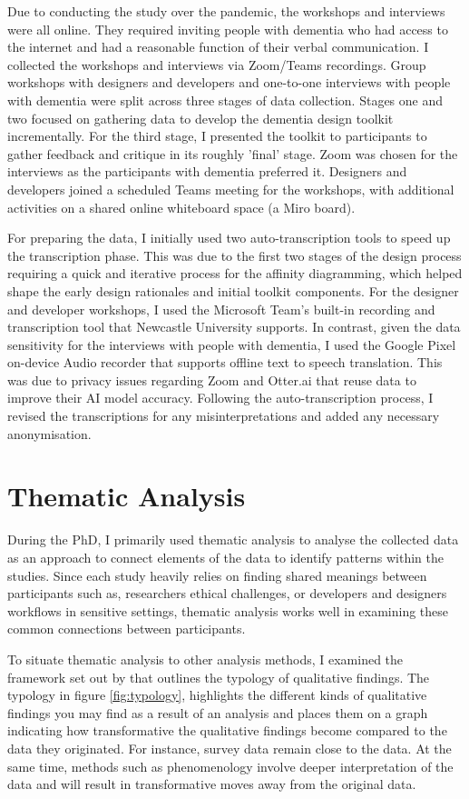 Due to conducting the study over the pandemic, the workshops and interviews were all online. They required inviting people with dementia who had access to the internet and had a reasonable function of their verbal communication. I collected the workshops and interviews via Zoom/Teams recordings. Group workshops with designers and developers and one-to-one interviews with people with dementia were split across three stages of data collection. Stages one and two focused on gathering data to develop the dementia design toolkit incrementally. For the third stage, I presented the toolkit to participants to gather feedback and critique in its roughly 'final' stage. Zoom was chosen for the interviews as the participants with dementia preferred it. Designers and developers joined a scheduled Teams meeting for the workshops, with additional activities on a shared online whiteboard space (a Miro board).

For preparing the data, I initially used two auto-transcription tools to speed up the transcription phase. This was due to the first two stages of the design process requiring a quick and iterative process for the affinity diagramming, which helped shape the early design rationales and initial toolkit components. For the designer and developer workshops, I used the Microsoft Team's built-in recording and transcription tool that Newcastle University supports. In contrast, given the data sensitivity for the interviews with people with dementia, I used the Google Pixel on-device Audio recorder that supports offline text to speech translation. This was due to privacy issues regarding Zoom and Otter.ai that reuse data to improve their AI model accuracy. Following the auto-transcription process, I revised the transcriptions for any misinterpretations and added any necessary anonymisation. 

\section{Thematic Analysis}
\label{TA}
During the PhD, I primarily used thematic analysis to analyse the collected data as an approach to connect elements of the data to identify patterns within the studies. Since each study heavily relies on finding shared meanings between participants such as, researchers ethical challenges, or developers and designers workflows in sensitive settings, thematic analysis works well in examining these common connections between participants. 

To situate thematic analysis to other analysis methods, I examined the framework set out by \cite{sandelowski2003classifying} that outlines the typology of qualitative findings. The typology in figure \ref{fig:typology}, highlights the different kinds of qualitative findings you may find as a result of an analysis and places them on a graph indicating how transformative the qualitative findings become compared to the data they originated. For instance, survey data remain close to the data. At the same time, methods such as phenomenology involve deeper interpretation of the data and will result in transformative moves away from the original data.

